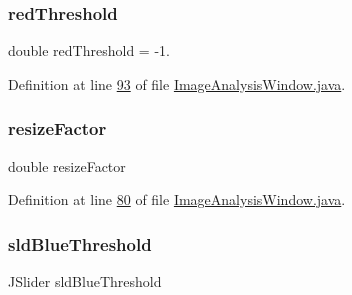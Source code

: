 \hypertarget{classgui_1_1_image_analysis_window_a62227209d40b51bbc076527490ebb0fd}{}\label{classgui_1_1_image_analysis_window_a62227209d40b51bbc076527490ebb0fd} 
\subsubsection{\texorpdfstring{red\+Threshold}{redThreshold}}
{\footnotesize\ttfamily double red\+Threshold = -\/1.\hspace{0.3cm}{\ttfamily [protected]}}



Definition at line \hyperlink{_image_analysis_window_8java_source_l00093}{93} of file \hyperlink{_image_analysis_window_8java_source}{Image\+Analysis\+Window.\+java}.

\hypertarget{classgui_1_1_image_analysis_window_a1b91ec80db300f73bee276f3fe72e766}{}\label{classgui_1_1_image_analysis_window_a1b91ec80db300f73bee276f3fe72e766} 
\subsubsection{\texorpdfstring{resize\+Factor}{resizeFactor}}
{\footnotesize\ttfamily double resize\+Factor\hspace{0.3cm}{\ttfamily [private]}}



Definition at line \hyperlink{_image_analysis_window_8java_source_l00080}{80} of file \hyperlink{_image_analysis_window_8java_source}{Image\+Analysis\+Window.\+java}.

\hypertarget{classgui_1_1_image_analysis_window_a456745261d318a98ce73b904d412b99f}{}\label{classgui_1_1_image_analysis_window_a456745261d318a98ce73b904d412b99f} 
\subsubsection{\texorpdfstring{sld\+Blue\+Threshold}{sldBlueThreshold}}
{\footnotesize\ttfamily J\+Slider sld\+Blue\+Threshold\hspace{0.3cm}{\ttfamily [protected]}}



